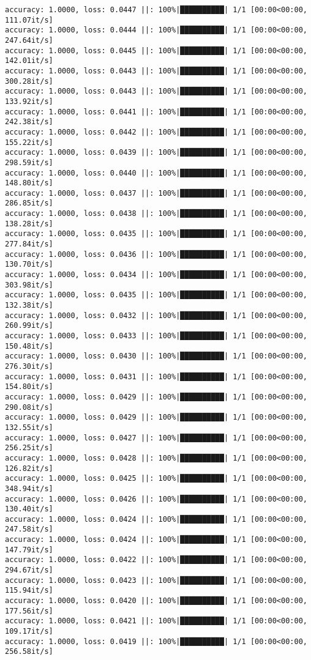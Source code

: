\documentclass[
]{article}
\begin{document}
\begin{verbatim}
accuracy: 1.0000, loss: 0.0447 ||: 100%|██████████| 1/1 [00:00<00:00, 111.07it/s]
accuracy: 1.0000, loss: 0.0444 ||: 100%|██████████| 1/1 [00:00<00:00, 247.64it/s]
accuracy: 1.0000, loss: 0.0445 ||: 100%|██████████| 1/1 [00:00<00:00, 142.01it/s]
accuracy: 1.0000, loss: 0.0443 ||: 100%|██████████| 1/1 [00:00<00:00, 300.28it/s]
accuracy: 1.0000, loss: 0.0443 ||: 100%|██████████| 1/1 [00:00<00:00, 133.92it/s]
accuracy: 1.0000, loss: 0.0441 ||: 100%|██████████| 1/1 [00:00<00:00, 242.38it/s]
accuracy: 1.0000, loss: 0.0442 ||: 100%|██████████| 1/1 [00:00<00:00, 155.22it/s]
accuracy: 1.0000, loss: 0.0439 ||: 100%|██████████| 1/1 [00:00<00:00, 298.59it/s]
accuracy: 1.0000, loss: 0.0440 ||: 100%|██████████| 1/1 [00:00<00:00, 148.80it/s]
accuracy: 1.0000, loss: 0.0437 ||: 100%|██████████| 1/1 [00:00<00:00, 286.85it/s]
accuracy: 1.0000, loss: 0.0438 ||: 100%|██████████| 1/1 [00:00<00:00, 138.28it/s]
accuracy: 1.0000, loss: 0.0435 ||: 100%|██████████| 1/1 [00:00<00:00, 277.84it/s]
accuracy: 1.0000, loss: 0.0436 ||: 100%|██████████| 1/1 [00:00<00:00, 130.70it/s]
accuracy: 1.0000, loss: 0.0434 ||: 100%|██████████| 1/1 [00:00<00:00, 303.98it/s]
accuracy: 1.0000, loss: 0.0435 ||: 100%|██████████| 1/1 [00:00<00:00, 132.38it/s]
accuracy: 1.0000, loss: 0.0432 ||: 100%|██████████| 1/1 [00:00<00:00, 260.99it/s]
accuracy: 1.0000, loss: 0.0433 ||: 100%|██████████| 1/1 [00:00<00:00, 150.48it/s]
accuracy: 1.0000, loss: 0.0430 ||: 100%|██████████| 1/1 [00:00<00:00, 276.30it/s]
accuracy: 1.0000, loss: 0.0431 ||: 100%|██████████| 1/1 [00:00<00:00, 154.80it/s]
accuracy: 1.0000, loss: 0.0429 ||: 100%|██████████| 1/1 [00:00<00:00, 290.08it/s]
accuracy: 1.0000, loss: 0.0429 ||: 100%|██████████| 1/1 [00:00<00:00, 132.55it/s]
accuracy: 1.0000, loss: 0.0427 ||: 100%|██████████| 1/1 [00:00<00:00, 256.25it/s]
accuracy: 1.0000, loss: 0.0428 ||: 100%|██████████| 1/1 [00:00<00:00, 126.82it/s]
accuracy: 1.0000, loss: 0.0425 ||: 100%|██████████| 1/1 [00:00<00:00, 348.94it/s]
accuracy: 1.0000, loss: 0.0426 ||: 100%|██████████| 1/1 [00:00<00:00, 130.40it/s]
accuracy: 1.0000, loss: 0.0424 ||: 100%|██████████| 1/1 [00:00<00:00, 247.58it/s]
accuracy: 1.0000, loss: 0.0424 ||: 100%|██████████| 1/1 [00:00<00:00, 147.79it/s]
accuracy: 1.0000, loss: 0.0422 ||: 100%|██████████| 1/1 [00:00<00:00, 294.67it/s]
accuracy: 1.0000, loss: 0.0423 ||: 100%|██████████| 1/1 [00:00<00:00, 115.94it/s]
accuracy: 1.0000, loss: 0.0420 ||: 100%|██████████| 1/1 [00:00<00:00, 177.56it/s]
accuracy: 1.0000, loss: 0.0421 ||: 100%|██████████| 1/1 [00:00<00:00, 109.17it/s]
accuracy: 1.0000, loss: 0.0419 ||: 100%|██████████| 1/1 [00:00<00:00, 256.58it/s]

\end{verbatim}
\end{document}
